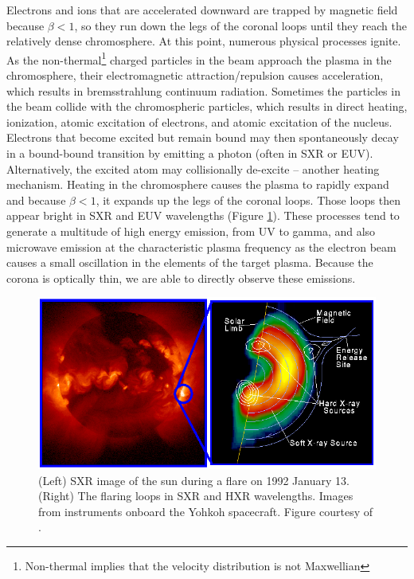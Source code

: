 Electrons and ions that are accelerated downward are trapped by magnetic field because $\beta < 1$, so they run down the legs of the coronal loops until they reach the relatively dense chromosphere. At this point, numerous physical processes ignite. As the non-thermal\footnote{Non-thermal implies that the velocity distribution is not Maxwellian} charged particles in the beam approach the plasma in the chromosphere, their electromagnetic attraction/repulsion causes acceleration, which results in bremsstrahlung continuum radiation. Sometimes the particles in the beam collide with the chromospheric particles, which results in direct heating, ionization, atomic excitation of electrons, and atomic excitation of the nucleus. Electrons that become excited but remain bound may then spontaneously decay in a bound-bound transition by emitting a photon (often in SXR or EUV). Alternatively, the excited atom may collisionally de-excite -- another heating mechanism. Heating in the chromosphere causes the plasma to rapidly expand and because $\beta < 1$, it expands up the legs of the coronal loops. Those loops then appear bright in SXR and EUV wavelengths (Figure \ref{fig:flaresxrhxr}). These processes tend to generate a multitude of high energy emission, from UV to gamma, and also microwave emission at the characteristic plasma frequency as the electron beam causes a small oscillation in the elements of the target plasma. Because the corona is optically thin, we are able to directly observe these emissions. 

\begin{figure}[!h]
    \begin{center}
	    \includegraphics[width=\textwidth]{Images/FlareInSXRAndHXR.png}
    \end{center}
    \caption[Solar Flare In Soft and Hard X-rays]{
        (Left) SXR image of the sun during a flare on 1992 January 13. (Right) The flaring loops in SXR and HXR 
        wavelengths. Images from instruments onboard the Yohkoh spacecraft. Figure courtesy of \citet{Holman2008}. 
    }
    \label{fig:flaresxrhxr}
\end{figure}

